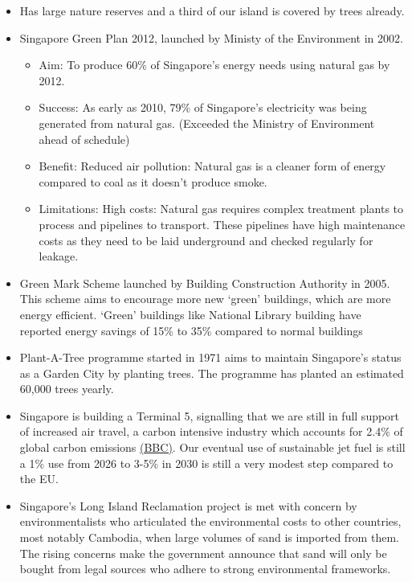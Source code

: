 \documentclass[oneside]{book}
\begin{document}
\begin{enumerate}
\begin{itemize}
\begin{itemize}
            \item Has large nature reserves and a third of our island is covered by trees already.
            \item Singapore Green Plan 2012, launched by Ministy of the Environment in 2002. 
            \begin{itemize}
                \item Aim: To produce 60\% of Singapore's energy needs using natural gas by 2012. 
                \item Success: As early as 2010, 79\% of Singapore's electricity was being generated from natural gas. (Exceeded the Ministry of Environment ahead of schedule)
                \item Benefit: Reduced air pollution: Natural gas is a cleaner form of energy compared to coal as it doesn't produce smoke.
                \item Limitations: High costs: Natural gas requires complex treatment plants to process and pipelines to transport. These pipelines have high maintenance costs as they need to be laid underground and checked regularly for leakage. 
            \end{itemize}
            \item Green Mark Scheme launched by Building Construction Authority in 2005. This scheme aims to encourage more new `green' buildings, which are more energy efficient. `Green' buildings like National Library building have reported energy savings of 15\% to 35\% compared to normal buildings
            \item Plant-A-Tree programme started in 1971 aims to maintain Singapore's status as a Garden City by planting trees. The programme has planted an estimated 60,000 trees yearly.
            \item Singapore is building a Terminal 5, signalling that we are still in full support of increased air travel, a carbon intensive industry which accounts for 2.4\% of global carbon emissions \href{https://www.bbc.com/future/article/20200218-climate-change-how-to-cut-your-carbon-emissions-when-flying}{(BBC)}. Our eventual use of sustainable jet fuel is still a 1\% use from 2026 to 3-5\% in 2030 is still a very modest step compared to the EU.
            \item Singapore's Long Island Reclamation project is met with concern by environmentalists who
            articulated the environmental costs to other countries, most notably Cambodia, when large volumes of sand is imported from them. The rising concerns make the government announce that sand will only be bought from legal sources who adhere to strong environmental frameworks.

\end{itemize}
\end{itemize}
\end{enumerate}
\end{document}
